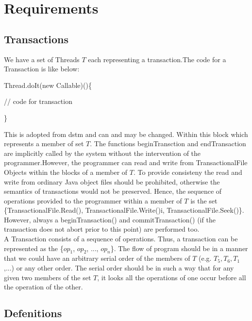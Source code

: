 \documentclass[a4paper, 11pt]{article}
\begin{document}
\section{Requirements}
\subsection{Transactions}
We have a set of Threads $T$ each representing a transaction.The code for a 
Transaction is like below:

\hspace{12mm}	Thread.doIt(new Callable)()\{

\hspace{12mm}		// code for transaction

\hspace{12mm}	\}

This is adopted from dstm and can and may be changed. Within this block which 
represents a member of set $T$. The functions beginTransction and endTransaction are implicitly called by the system without the intervention of the programmer.However, the programmer can read and write from TransactionalFile Objects within the blocks of a member of $T$. To provide consisteny the read and write from ordinary Java object files should be prohibited, otherwise the semantics of transactions would not be preserved. Hence, the sequence of operations provided to the programmer within a member of $T$ is the set \{TransactionalFile.Read(), TransactionalFile.Write()i, TransactionalFile.Seek()\}. However, always a beginTransaction() and commitTransaction() (if the transaction does not abort prior to this point) are performed too. \\ 

A Transaction consists of a sequence of operations. Thus, a transaction can be represented as the \{$op_1$, $op_2$, ..., $op_n$\}. The flow of program should be in a manner that we could have an arbitrary serial order of the members of $T$ (e.g. $T_5,T_6,T_1$,...) or any other order. The serial order should be in such a way that for any given two members of the set $T$, it looks all the operations of one occur before all the operation of the other. %

\subsection{Defenitions}
\end{document}
